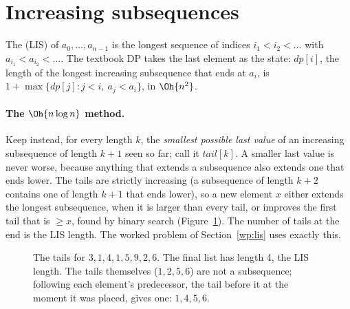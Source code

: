 \section[Increasing subsequences]{Increasing subsequences \hfill \gold}\label{sec:lis}

The  (LIS) of $a_0, \dots, a_{n-1}$ is the longest sequence of indices $i_1 < i_2 < \dots$ with
$a_{i_1} < a_{i_2} < \dots$. The textbook DP takes the last element as the state: $dp[i]$, the length of the longest increasing
subsequence that ends at $a_i$, is $1 + \max\{dp[j] : j < i,\ a_j < a_i\}$, in $\Oh{n^2}$.

\paragraph{The $\Oh{n \log n}$ method.} Keep instead, for every length $k$, the \emph{smallest possible last value} of an increasing
subsequence of length $k + 1$ seen so far; call it $\mathit{tail}[k]$. A smaller last value is never worse, because anything that
extends a subsequence also extends one that ends lower. The tails are strictly increasing (a subsequence of length $k + 2$ contains
one of length $k + 1$ that ends lower), so a new element $x$ either extends the longest subsequence, when it is larger than every
tail, or improves the first tail that is $\ge x$, found by binary search (Figure~\ref{fig:lis}). The number of tails at the end is
the LIS length. The worked problem of Section~\ref{wp:lis} uses exactly this.

\begin{figure}[htbp]
\centering
{}
\caption{The tails for $3, 1, 4, 1, 5, 9, 2, 6$. The final list has length 4, the LIS length. The tails themselves ($1, 2, 5, 6$) are
not a subsequence; following each element's predecessor, the tail before it at the moment it was placed, gives one: $1, 4, 5, 6$.}
\label{fig:lis}
\end{figure}

